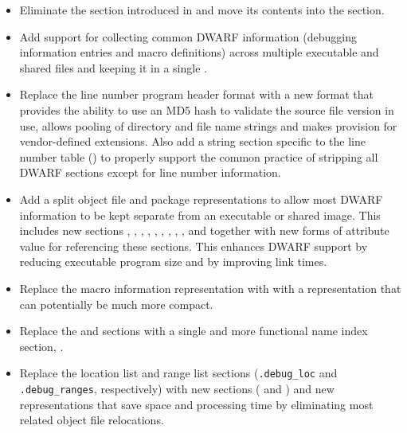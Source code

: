 \begin{itemize}
\item Eliminate the \dotdebugtypes{}
section introduced in \DWARFVersionIV{} 
and move its contents into the \dotdebuginfo{} section.
\item Add support for collecting common DWARF information 
(debugging information entries and macro definitions)
across multiple executable and shared files and keeping it in a single
.
\item Replace the line number program header format with a new 
format that 
provides the ability to use an MD5 hash to validate 
the source file version in use, allows pooling 
of directory and file name strings and makes provision for vendor-defined
extensions. Also add a string section specific to the line number table 
(\dotdebuglinestr)
to properly support the common practice of stripping all DWARF sections
except for line number information.
\item Add a split object file and package representations to allow most 
DWARF information to be kept separate from an executable 
or shared image. This includes new sections 
\dotdebugaddr, \dotdebugstroffsets, \dotdebugabbrevdwo, \dotdebuginfodwo, 
\dotdebuglinedwo, \dotdebugloclistsdwo, \dotdebugmacrodwo, \dotdebugstrdwo,
\dotdebugstroffsetsdwo, \dotdebugcuindex{} and \dotdebugtuindex{} 
together with new forms of attribute value for referencing these sections.
This enhances DWARF support by reducing executable program size and
by improving link times.
\item Replace the \dotdebugmacinfo{} macro information representation with
with a \dotdebugmacro{} representation that can potentially be much more compact.
\item Replace the \dotdebugpubnames{} and \dotdebugpubtypes{} sections
with a single and more functional name index section, \dotdebugnames{}.

\item Replace the location list and range list sections (\texttt{.debug\_loc} 
and \texttt{.debug\_ranges}, respectively) with new sections (\dotdebugloclists{} 
and \dotdebugrnglists) and new representations that
save space and processing time by eliminating most related
object file relocations.


\end{itemize}
